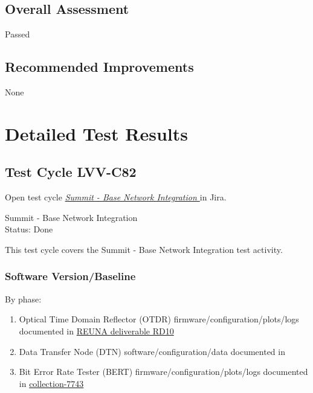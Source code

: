 \documentclass[DM,lsstdraft,STR,toc]{lsstdoc}
\providecommand{\tightlist}{
  \setlength{\itemsep}{0pt}\setlength{\parskip}{0pt}}
\begin{document}
\subsection{Overall Assessment}
\label{sect:overallassessment}

Passed


\subsection{Recommended Improvements}
\label{sect:recommendations}

None


\newpage
\section{Detailed Test Results}
\label{sect:detailedtestresults}


  \subsection{Test Cycle LVV-C82 }

Open test cycle {\it \href{https://jira.lsstcorp.org/secure/Tests.jspa#/testrun/LVV-C82}{Summit - Base Network Integration
}} in Jira.

  Summit - Base Network Integration
\\
  Status: Done

  This test cycle covers the Summit - Base Network Integration test
activity.


  \subsubsection{Software Version/Baseline}
    By phase:\\

\begin{enumerate}
\tightlist
\item
  Optical Time Domain Reflector (OTDR) firmware/configuration/plots/logs
  documented in
  \href{https://docushare.lsstcorp.org/docushare/dsweb/Get/Document-26270/RD10\%20Report\%20of\%20delivery\%20of\%20LS\%20-\%20AG\%20fiber\%20from\%20Telefonica\%20to\%20REUNA.pdf}{REUNA
  deliverable RD10}
\item
  Data Transfer Node (DTN) software/configuration/data documented in
\item
  Bit Error Rate Tester (BERT) firmware/configuration/plots/logs
  documented in
  \href{https://docushare.lsstcorp.org/docushare/dsweb/View/Collection-7743}{collection-7743}
\end{enumerate}
\end{document}
